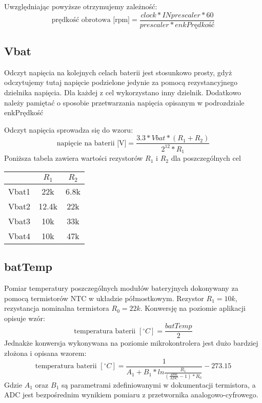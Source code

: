 \documentclass{article}
\begin{document}
Uwzględniając powyższe otrzymujemy zależność:
$$
\textrm{prędkość obrotowa [rpm]}=\frac{clock*INprescaler*60}{prescaler*enkPrędkość}
$$

\subsection{Vbat}
Odczyt napięcia na kolejnych celach baterii jest stosunkowo prosty, gdyż odczytujemy tutaj napięcie podzielone jedynie za pomocą rezystancyjnego dzielnika napięcia. Dla każdej z cel wykorzystano inny dzielnik. Dodatkowo należy pamiętać o sposobie przetwarzania napięcia opisanym w podrozdziale enkPrędkość

Odczyt napięcia sprowadza się do wzoru:
$$
\textrm{napięcie na baterii [V]}=\frac{3.3*Vbat*(R_1+R_2)}{2^{12}*R_1}
$$
Poniższa tabela zawiera wartości rezystorów $R_1$ i $R_2$ dla poszczególnych cel

\begin{tabular}{|c|c|c|}
\hline
 & $R_1$ & $R_2$ \\ \hline
 Vbat1 & 22k &6.8k \\ \hline
 Vbat2 & 12.4k & 22k \\ \hline
 Vbat3 & 10k & 33k \\ \hline
 Vbat4 & 10k & 47k \\ \hline
\end{tabular}

\subsection{batTemp}
Pomiar temperatury poszczególnych modułów bateryjnych dokonywany za pomocą termistorów NTC w układzie półmostkowym. Rezystor $R_1 = 10k$, rezystancja nominalna termistora $R_0 = 22k$. Konwersję na poziomie aplikacji opisuje wzór:
$$
\textrm{temperatura baterii }[^{\circ}C] = \frac{batTemp}{2} 
$$
Jednakże konwersja wykonywana na poziomie mikrokontrolera jest dużo bardziej złożona i opisana wzorem:
$$
\textrm{temperatura baterii }[^{\circ}C] = \frac{1}{A_1+B_1*ln\frac{R_1}{(\frac{4096}{ADC}-1)*R_0}}-273.15
$$
Gdzie $A_1$ oraz $B_1$ są parametrami zdefiniowanymi w dokumentacji termistora, a ADC jest bezpośrednim wynikiem pomiaru z przetwornika analogowo-cyfrowego.
\end{document}
